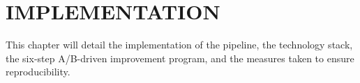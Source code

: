 \chapter{IMPLEMENTATION}


This chapter will detail the implementation of the pipeline, the technology stack, the six-step A/B-driven improvement program, and the measures taken to ensure reproducibility.
